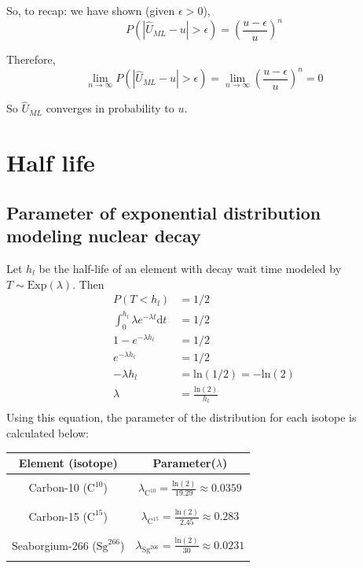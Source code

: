 \documentclass[paper=a4, fontsize=11pt]{scrartcl} %
\numberwithin{equation}{section} %
\numberwithin{figure}{section} %
\numberwithin{table}{section} %
\begin{document}
So, to recap: we have shown (given $\epsilon > 0 $),
\[P\left(\left|\hat{U}_{ML} - u \right| > \epsilon \right) = \left(\frac{u-\epsilon}{u}\right)^n\]

Therefore, 
\[\lim_{n \to \infty} P\left(\left|\hat{U}_{ML} - u \right| > \epsilon \right) = \lim_{n \to \infty} \left(\frac{u-\epsilon}{u}\right)^n = 0\]

So $\hat{U}_{ML}$ converges in probability to $u$.


\section{Half life}

\subsection{Parameter of exponential distribution modeling nuclear decay}

Let $h_l$ be the half-life of an element with decay wait time modeled by $T \sim \textrm{Exp}(\lambda)$.
Then
\begin{align*}
P(T < h_l) &= 1/2 \\
\int_0^{h_l} \lambda e^{- \lambda t} \textrm{d}t &= 1/2 \\
1 - e^{-\lambda h_l} &= 1/2 \\
e^{-\lambda h_l} &= 1/2 \\
-\lambda h_l &= \textrm{ln}(1/2) = - \textrm{ln}(2)\\
\lambda &= \frac{\textrm{ln}(2)}{h_l} \\
\end{align*}
Using this equation, the parameter of the distribution for each isotope is calculated below:

\begin{center}
   \begin{tabular}{ | c | c | }
      \hline
      \textbf{Element (isotope)} & \textbf{Parameter($\lambda$)} \\ \hline
      \qquad{} & \qquad{} \\
      Carbon-10 ($\textrm{C}^{10}$) & $\lambda_{\textrm{C}^{10}} = \frac{\textrm{ln}(2)}{19.29} \approx 0.0359$ \\ 
      \qquad{} & \qquad{} \\ \hline
      \qquad{} & \qquad{} \\
      Carbon-15 ($\textrm{C}^{15}$) & $\lambda_{\textrm{C}^{15}} = \frac{\textrm{ln}(2)}{2.45} \approx 0.283$ \\
      \qquad{} & \qquad{} \\\hline
      \qquad{} & \qquad{} \\
      Seaborgium-266 ($\textrm{Sg}^{266}$) & $\lambda_{\textrm{Sg}^{266}} = \frac{\textrm{ln}(2)}{30} \approx 0.0231$ \\ 
      \qquad{} & \qquad{} \\\hline
   \end{tabular}
\end{center}
\end{document}
